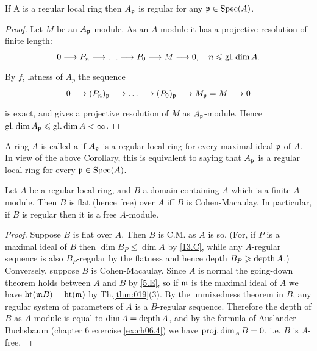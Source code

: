 \documentclass[../main]{subfiles}
\begin{document}
\begin{corollary} If A is a regular local ring then $A_{\mathfrak{p}}$ is regular for any $\mathfrak{p} \in \operatorname{Spec}(A)$.
\end{corollary}
\begin{proof}
Let $M$ be an $A_{\mathfrak{p}}$-module. As an $A$-module it has a projective resolution of finite length: \[0 \varrightarrow{} P_{n} \varrightarrow{} \dots \varrightarrow{} P_{0} \varrightarrow{} M\varrightarrow{} 0,\quad n \leq \GlDim A.\] By $f$, latness of $A_{p}$ the sequence \[0 \varrightarrow{}(P_{n})_{\ideal{p}} \varrightarrow{} \dots \varrightarrow{}(P_{0})_{\ideal{p}} \varrightarrow{} M_{\ideal{p}}=M \varrightarrow{} 0\] is exact, and gives a projective resolution of $M$ as $A_{\mathfrak{p}}$-module. Hence \newline $\operatorname{gl. dim} A_{\mathfrak{p}} \leqslant \operatorname{gl. dim} A<\infty$.
\end{proof} 
\begin{definition}
A ring $A$ is called a  if $A_{\mathfrak{p}}$ is a regular local ring for every maximal ideal $\mathfrak{p}$ of $A$. In view of the above Corollary, this is equivalent to saying that $A_{\mathfrak{p}}$ is a regular local ring for every $\mathfrak{p} \in \operatorname{Spec}(A)$.
\end{definition}

\begin{partheorem}\label{thm:046} Let $A$ be a regular local ring, and $B$ a
domain containing $A$ which is a finite $A$-module. Then $B$ is flat
(hence free) over $A$ iff $B$ is Cohen-Macaulay, In particular,
if $B$ is regular then it is a free $A$-module.
\end{partheorem} 

\begin{proof}Suppose $B$ is flat over $A$. Then $B$ is C.M. as $A$ is so. (For, if $P$ is a maximal ideal of $B$ then $\dim B_{P} \leqslant \dim A$ by \ref{13.C}, while any $A$-regular sequence is also $B_{P}$-regular by the flatness and hence depth $B_{P} \geqslant \operatorname{depth} A$.) Conversely, suppose $B$ is Cohen-Macaulay. Since $A$ is normal the going-down theorem holds between $A$ and $B$ by \ref{5.E}, so if $\mathfrak{m}$ is the maximal ideal of $A$ we have $\operatorname{ht}(\mathfrak{m}B)=\operatorname{ht}(\mathfrak{m})$ by Th.\ref{thm:019}(3). By the unmixedness theorem in $B$, any regular system of parameters of $A$ is a $B$-regular sequence. Therefore the depth of $B$ as $A$-module is equal to $\operatorname{dim} A=\operatorname{depth} A$, and by the formula of Auslander-Buchsbaum (chapter 6 exercise \ref{ex:ch06.4}) we have $\operatorname{proj. dim}_A B=0$, i.e. $B$ is $A$-free.
\end{proof}
\end{document}
